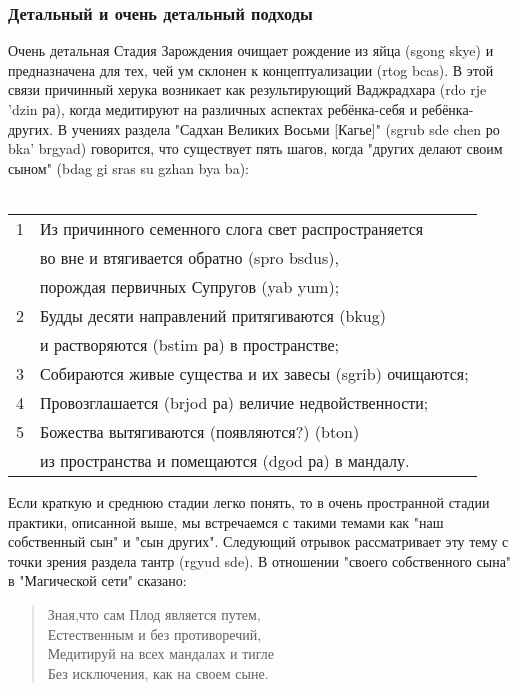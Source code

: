 \subsubsection{Детальный и очень детальный подходы}
\vspace{1cm}
Очень детальная Стадия Зарождения очищает рождение из яйца (sgong skye) и
предназначена для тех, чей ум склонен к концептуализации (rtog bcas). В этой связи
причинный херука возникает как результирующий Ваджрадхара (rdo rje 'dzin ра), когда
медитируют на различных аспектах ребёнка-себя и ребёнка-других. В учениях раздела
"Садхан Великих Восьми [Кагье]" (sgrub sde chen ро bka' brgyad) говорится, что существует
пять шагов, когда "других делают своим сыном" (bdag gi sras su gzhan bya ba):\\
\\
\begin{tabular}{ll}
1 & Из причинного семенного слога свет распространяется \\
  & во вне и втягивается обратно (spro bsdus), \\
  & порождая первичных Супругов (yab yum);\\
2 & Будды десяти направлений притягиваются (bkug) \\
  & и растворяются (bstim ра) в пространстве;\\
3 & Собираются живые существа и их завесы (sgrib) очищаются;\\
4 & Провозглашается (brjod ра) величие недвойственности;\\
5 & Божества вытягиваются (появляются?) (bton) \\
  & из пространства и помещаются (dgod ра) в мандалу.\\
\end{tabular}

\begin{siderules}
Если краткую и среднюю стадии легко понять, то в очень пространной стадии практики,
описанной выше, мы встречаемся с такими темами как "наш собственный сын" и "сын
других". Следующий отрывок рассматривает эту тему с точки зрения раздела тантр
(rgyud sde). В отношении "своего собственного сына" в "Магической сети" сказано:

\begin{verse}
Зная,что сам Плод является путем,\\
Естественным и без противоречий,\\
Медитируй на всех мандалах и тигле\\
Без исключения, как на своем сыне.\\
\end{verse}

\end{siderules}

